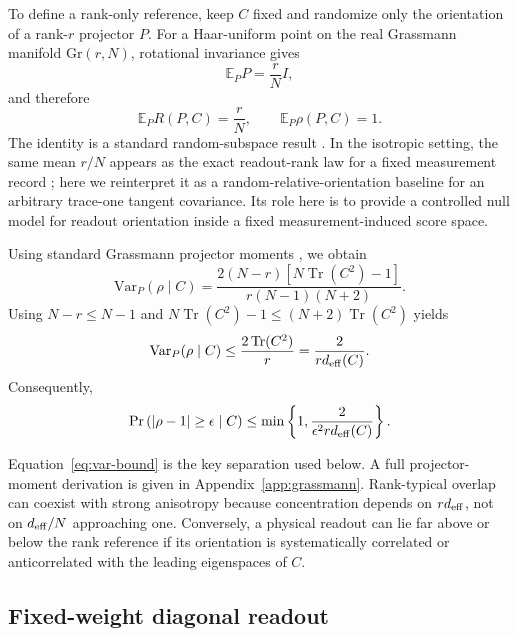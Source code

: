 \documentclass[aps,prx,reprint,superscriptaddress,nofootinbib,longbibliography]{revtex4-2}
\newcommand{\Tr}{\operatorname{Tr}}
\newcommand{\deff}{d_{\rm eff}}
\begin{document}
To define a rank-only reference, keep $C$ fixed and randomize only the orientation of a rank-$r$ projector $P$. For a Haar-uniform point on the real Grassmann manifold $\mathrm{Gr}(r,N)$, rotational invariance gives
\begin{equation}
\mathbb{E}_P P=\frac{r}{N}I,
\end{equation}
and therefore
\begin{equation}
\mathbb{E}_P R(P,C)=\frac{r}{N},
\qquad
\mathbb{E}_P\rho(P,C)=1.
\label{eq:rank-baseline}
\end{equation}
The identity is a standard random-subspace result \cite{CollinsMatsumoto2017,Bendokat2024,Fernandez2025}. In the isotropic setting, the same mean $r/N$ appears as the exact readout-rank law for a fixed measurement record \cite{AitHaddou2026IsotropicRankLaws}; here we reinterpret it as a random-relative-orientation baseline for an arbitrary trace-one tangent covariance. Its role here is to provide a controlled null model for readout orientation inside a fixed measurement-induced score space.

Using standard Grassmann projector moments \cite{CollinsMatsumoto2017}, we obtain
\begin{equation}
\mathrm{Var}_P(\rho\mid C)
=\frac{2(N-r)\left[N\Tr(C^2)-1\right]}
{r(N-1)(N+2)}.
\label{eq:exact-var}
\end{equation}
Using $N-r\le N-1$ and $N\Tr(C^2)-1\le(N+2)\Tr(C^2)$ yields
\begin{equation}
\mathrm{Var}_P(\rho\mid C)
\le \frac{2\Tr(C^2)}{r}
=\frac{2}{r\deff(C)}.
\label{eq:var-bound}
\end{equation}
Consequently,
\begin{equation}
\Pr\left(|\rho-1|\ge\epsilon\mid C\right)
\le
\min\left\{1,\frac{2}{\epsilon^2r\deff(C)}\right\}.
\label{eq:cheb}
\end{equation}

Equation~\eqref{eq:var-bound} is the key separation used below. A full projector-moment derivation is given in Appendix~\ref{app:grassmann}. Rank-typical overlap can coexist with strong anisotropy because concentration depends on $r\deff$, not on $\deff/N$ approaching one. Conversely, a physical readout can lie far above or below the rank reference if its orientation is systematically correlated or anticorrelated with the leading eigenspaces of $C$.

\subsection{Fixed-weight diagonal readout}
\end{document}
